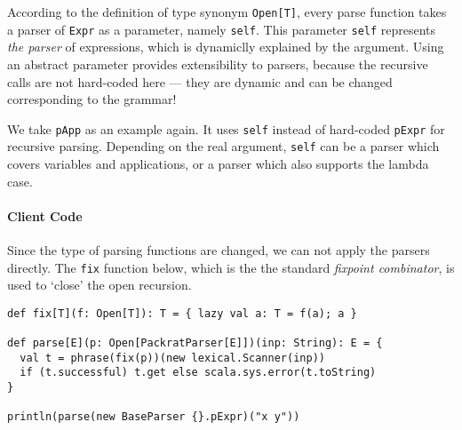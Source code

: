 According to the definition of type synonym \lstinline{Open[T]}, every parse function takes a parser of \lstinline{Expr} as a parameter, namely \lstinline{self}. This parameter \lstinline{self} represents \emph{the parser} of expressions, which is dynamiclly explained by the argument. Using an abstract parameter provides extensibility to parsers, because the recursive calls are not hard-coded here --- they are dynamic and can be changed corresponding to the grammar!

We take \lstinline{pApp} as an example again. It uses \lstinline{self} instead of hard-coded \lstinline{pExpr} for recursive parsing. Depending on the real argument, \lstinline{self} can be a parser which covers variables and applications, or a parser which also supports the lambda case.

\paragraph{Client Code} Since the type of parsing functions are changed, we can not apply the parsers directly. The \lstinline{fix} function below, which is the the standard \textit{fixpoint combinator}, is used to `close' the open recursion.

\begin{lstlisting}
def fix[T](f: Open[T]): T = { lazy val a: T = f(a); a }

def parse[E](p: Open[PackratParser[E]])(inp: String): E = {
  val t = phrase(fix(p))(new lexical.Scanner(inp))
  if (t.successful) t.get else scala.sys.error(t.toString)
}

println(parse(new BaseParser {}.pExpr)("x y"))
\end{lstlisting}



